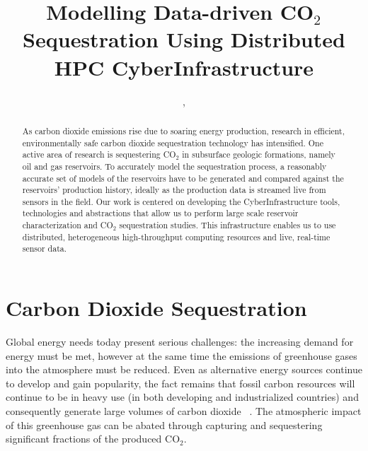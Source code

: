 \documentclass[10pt,conference,final]{IEEEtran}
\begin{document}
\title{Modelling Data-driven CO$_{2}$ Sequestration Using Distributed HPC CyberInfrastructure}

 \author{,
    }


\maketitle

\begin{abstract}
As carbon dioxide emissions rise due to soaring energy production, research in
efficient, environmentally safe carbon dioxide sequestration technology has intensified.
One active area of research is sequestering CO$_2$ in subsurface geologic formations,
namely oil and gas reservoirs. To accurately model the sequestration process, a
reasonably accurate set of models of the reservoirs have to be generated and compared
against the reservoirs' production history, ideally as the production data is streamed live from 
sensors in the field. Our work is centered on developing the CyberInfrastructure tools,
technologies and abstractions that allow us to perform large scale reservoir characterization
and CO$_2$ sequestration studies. This infrastructure enables us to use distributed, heterogeneous
high-throughput computing resources and live, real-time sensor data.
\end{abstract}


\section*{Carbon Dioxide Sequestration}
Global energy needs today present serious challenges: the increasing demand for energy 
must be met, however at the same time the 
emissions of greenhouse gases into the atmosphere must be reduced. Even as alternative 
energy sources continue to develop and gain 
popularity, the fact remains that fossil carbon resources will continue to be in heavy use 
(in both developing and industrialized 
countries) and consequently generate large volumes of carbon dioxide ~\cite{GeoRPT}. The 
atmospheric impact of this greenhouse gas 
can be abated through capturing and sequestering significant fractions of the produced 
CO$_2$.
\end{document}
